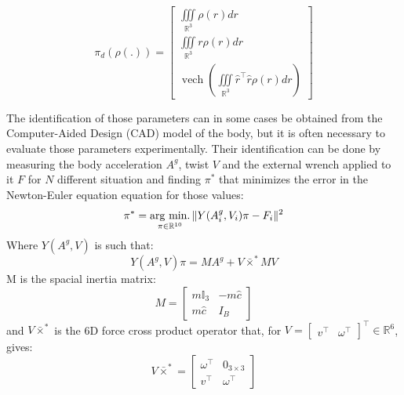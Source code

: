 \begin{equation}
\pi_d(\rho(.))
  =
  \begin{bmatrix}
    \iiint\limits_{\mathbb{R}^3} \rho(r) dr \\
    \iiint\limits_{\mathbb{R}^3} r \rho(r) dr \\
    \operatorname{vech}\left(
    \iiint\limits_{\mathbb{R}^3} {\hat{r}}^\top \hat{r} \rho({r}) d{r} \right)
  \end{bmatrix}
\end{equation}

The identification of those parameters can in some cases be obtained from the Computer-Aided Design (CAD) model of the body, but it is often necessary to evaluate those parameters experimentally.
Their identification can be done by measuring the body acceleration $A^g$, twist $V$ and the external wrench applied to it $F$ for $N$ different situation and finding $\pi^*$ that minimizes the error in the Newton-Euler equation equation for those values:
\begin{equation}
\label{eq:classicIdentif}
  \pi^* = \operatorname*{arg\ min.}_{\pi\in\mathbb{R}^{10}} \|Y(A^g_i,V_i)\pi -F_i\|^2
\end{equation}
Where $Y(A^g,V)$ is such that:
$$
Y(A^g,V)\pi = M A^g + V\bar{\times}^*MV
$$
M is the spacial inertia matrix:
\begin{equation}
M=
  \begin{bmatrix}
    m\mathbb{I}_3 & -m\hat{c} \\
    m\hat{c} & I_B
  \end{bmatrix}
\end{equation}
and $V \bar \times^*$ is the 6D force cross product operator \cite{featherstone:book:2007} that, for $V = \begin{bmatrix} v^\top & \omega^\top \end{bmatrix}^\top \in \mathbb{R}^6$, gives:
$$
V \bar \times^*
=
\begin{bmatrix}
\omega^\top & 0_{3\times3} \\
v^\top      & \omega^\top
\end{bmatrix}
$$

